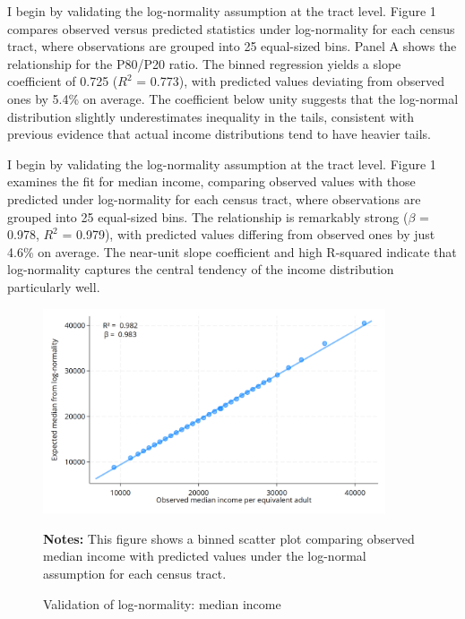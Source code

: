 I begin by validating the log-normality assumption at the tract level. Figure 1 compares observed versus predicted statistics under log-normality for each census tract, where observations are grouped into 25 equal-sized bins. Panel A shows the relationship for the P80/P20 ratio. The binned regression yields a slope coefficient of 0.725 ($R^2$ = 0.773), with predicted values deviating from observed ones by 5.4\% on average. The coefficient below unity suggests that the log-normal distribution slightly underestimates inequality in the tails, consistent with previous evidence that actual income distributions tend to have heavier tails.

I begin by validating the log-normality assumption at the tract level. Figure 1 examines the fit for median income, comparing observed values with those predicted under log-normality for each census tract, where observations are grouped into 25 equal-sized bins. The relationship is remarkably strong ($\beta$ = 0.978, $R^2$ = 0.979), with predicted values differing from observed ones by just 4.6\% on average. The near-unit slope coefficient and high R-squared indicate that log-normality captures the central tendency of the income distribution particularly well.

\begin{figure}[H]
\begin{center}
\captionsetup{justification=centering}
\caption{Validation of log-normality: median income}
\label{fig:median}
\includegraphics[width=0.9\textwidth]{output/binned_scatter_median.png}
\end{center}
\begin{fignotes}
\textbf{Notes:} This figure shows a binned scatter plot comparing observed median income with predicted values under the log-normal assumption for each census tract. 
\end{fignotes}
\end{figure}

